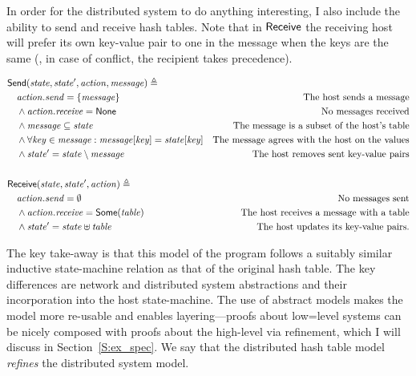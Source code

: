 In order for the distributed system to do anything interesting, I also include
the ability to send and receive hash tables. Note that in \(\mathsf{Receive}\) the
receiving host will prefer its own key-value pair to one in the message when the
keys are the same (\ie, in case of conflict, the recipient takes precedence).

\begin{align*}
    & \mathsf{Send}(\mathit{state}, \mathit{state'}, \mathit{action}, \mathit{message}) \triangleq\; \\
    & \quad \mathit{action.send} = \left\{\mathit{message}\right\}  & \text{The host sends a message} \\
    & \quad \land \mathit{action.receive} = \mathsf{None} & \text{No messages received} \\
    & \quad \land \mathit{message} \subseteq \mathit{state} & \text{The message is a subset of the host's table} \\
    & \quad \land \forall \mathit{key} \in \mathit{message} : \mathit{message}[\mathit{key}] = \mathit{state}[\mathit{key}]
        & \text{The message agrees with the host on the values} \\
    & \quad \land \mathit{state'} = \mathit{state} \setminus \mathit{message}
        & \text{The host removes sent key-value pairs}\\
    \\
    & \mathsf{Receive}(\mathit{state}, \mathit{state'}, \mathit{action}) \triangleq\; \\
    & \quad \mathit{action.send} = \emptyset & \text{No messages sent} \\
    & \quad \land \mathit{action.receive} = \mathsf{Some}(\mathit{table})
        & \text{The host receives a message with a table} \\
    & \quad \land \mathit{state'} = \mathit{state} \uplus \mathit{table}
        & \text{The host updates its key-value pairs.}
\end{align*}

The key take-away is that this model of the program follows a suitably similar
inductive state-machine relation as that of the original hash table. The key
differences are network and distributed system abstractions and their
incorporation into the host state-machine. The use of abstract models makes the
model more re-usable and enables layering---proofs about low=level systems can be
nicely composed with proofs about the high-level via refinement, which I will
discuss in Section~\ref{S:ex_spec}. We say that the distributed hash table
model \emph{refines} the distributed system model.

